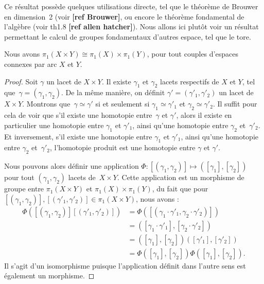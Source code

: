 Ce résultat possède quelques utilisations directe, tel que le théorème de Brouwer en dimension~2 (voir \textbf{[ref Brouwer]}, ou encore le théorème fondamental de l'algèbre (voir th1.8 \textbf{[ref allen hatcher]}). Nous allons ici plutôt voir un résultat permettant le calcul de groupes fondamentaux d'autres espace, tel que le tore.

\begin{proposition}
Nous avons ${\pi_1(X\times Y)\cong\pi_1(X)\times\pi_1(Y)}$, pour tout couples d'espaces connexes par arc $X$ et $Y$.
\end{proposition}
\begin{proof}
Soit $\gamma$ un lacet de $X\times Y$. Il existe $\gamma_1$ et $\gamma_2$ lacets respectifs de $X$ et $Y$, tel que~${\gamma=(\gamma_1,\gamma_2)}$. De la même manière, on définit $\gamma'=(\gamma'_1,\gamma'_2)$ un lacet de $X\times Y$. Montrons que~${\gamma\simeq \gamma'}$ si et seulement si $\gamma_1\simeq\gamma'_1$ et $\gamma_2\simeq\gamma'_2$. Il suffit pour cela de voir que s'il existe une homotopie entre~$\gamma$ et $\gamma'$, alors il existe en particulier une homotopie entre $\gamma_1$ et $\gamma'_1$, ainsi qu'une homotopie entre $\gamma_2$ et~$\gamma'_2$. Et inversement, s'il existe une homotopie entre $\gamma_1$ et $\gamma'_1$, ainsi qu'une homotopie entre $\gamma_2$ et~$\gamma'_2$, l'homotopie produit est une homotopie entre $\gamma$ et $\gamma'$.

Nous pouvons alors définir une application $\Phi:[(\gamma_1,\gamma_2)]\mapsto([\gamma_1],[\gamma_2])$ pour tout $(\gamma_1,\gamma_2)$ lacets de~$X\times Y$. Cette application est un morphisme de groupe entre $\pi_1(X\times Y)$ et $\pi_1(X)\times\pi_1(Y)$, du fait que pour $[(\gamma_1,\gamma_2)],[(\gamma'_1,\gamma'_2)]\in\pi_1(X\times Y)$, nous avons : \[\begin{split}
\Phi([(\gamma_1,\gamma_2)][(\gamma'_1,\gamma'_2)])&=\Phi([(\gamma_1\cdot\gamma'_1,\gamma_2\cdot\gamma'_2)])\\
&=([\gamma_1\cdot\gamma'_1],[\gamma_2\cdot\gamma'_2])\\
&=([\gamma_1],[\gamma_2])([\gamma'_1],[\gamma'_2])\\
&=\Phi([\gamma_1],[\gamma_2])\Phi([\gamma_1],[\gamma_2]).
\end{split}\]Il s'agit d'un isomorphisme puisque l'application définit dans l'autre sens est également un morphisme.
\end{proof}

